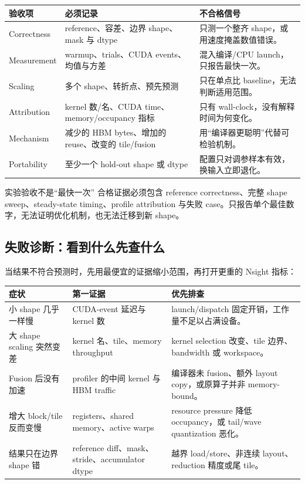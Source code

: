 \documentclass[a4paper]{article}
\begin{document}
\begin{longtable}{p{}p{}p{}}
\toprule
\textbf{验收项} & \textbf{必须记录} & \textbf{不合格信号} \\
\midrule
Correctness & reference、容差、边界 shape、mask 与 dtype & 只测一个整齐 shape，或用速度掩盖数值错误。 \\
Measurement & warmup、trials、CUDA events、均值与方差 & 混入编译/CPU launch，只报告最快一次。 \\
Scaling & 多个 shape、转折点、预先预测 & 只在单点比 baseline，无法判断适用范围。 \\
Attribution & kernel 数/名、CUDA time、memory/occupancy 指标 & 只有 wall-clock，没有解释时间为何变化。 \\
Mechanism & 减少的 HBM bytes、增加的 reuse、改变的 tile/fusion & 用“编译器更聪明”代替可检验机制。 \\
Portability & 至少一个 hold-out shape 或 dtype & 配置只对调参样本有效，换输入立即退化。 \\
\bottomrule
\end{longtable}

\begin{warningbox}{实验验收不是“最快一次”}
合格证据必须包含 reference correctness、完整 shape sweep、steady-state timing、profile attribution 与失败 case。只报告单个最佳数字，无法证明优化机制，也无法迁移到新 shape。
\end{warningbox}

\subsection{失败诊断：看到什么先查什么}

当结果不符合预测时，先用最便宜的证据缩小范围，再打开更重的 Nsight 指标：

\begin{longtable}{p{}p{}p{}}
\toprule
\textbf{症状} & \textbf{第一证据} & \textbf{优先排查} \\
\midrule
小 shape 几乎一样慢 & CUDA-event 延迟与 kernel 数 & launch/dispatch 固定开销，工作量不足以占满设备。 \\
大 shape scaling 突然变差 & kernel 名、tile、memory throughput & kernel selection 改变、tile 边界、bandwidth 或 workspace。 \\
Fusion 后没有加速 & profiler 的中间 kernel 与 HBM traffic & 编译器未 fusion、额外 layout copy，或原算子并非 memory-bound。 \\
增大 block/tile 反而变慢 & registers、shared memory、active warps & resource pressure 降低 occupancy，或 tail/wave quantization 恶化。 \\
结果只在边界 shape 错 & reference diff、mask、stride、accumulator dtype & 越界 load/store、非连续 layout、reduction 精度或尾 tile。 \\
\bottomrule
\end{longtable}
\end{document}
